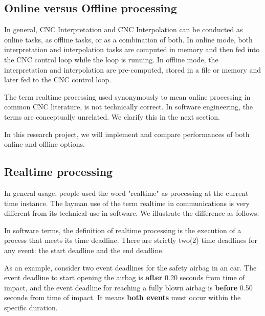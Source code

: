 \subsection{Online versus Offline processing}

In general, CNC Interpretation and CNC Interpolation can be conducted as online tasks, as offline tasks, or as a combination of both. In online mode, both interpretation and interpolation tasks are computed in memory and then fed into the CNC control loop while the loop is running. In offline mode, the interpretation and interpolation are pre-computed, stored in a file or memory and later fed to the CNC control loop. 
\vspace*{1\baselineskip}

The term realtime processing used synonymously to mean online processing in common CNC literature, is not technically correct. In software engineering, the terms are conceptually unrelated. We clarify this in the next section. 

\begin{tcolorbox}[colback=green!15!white, colframe=red!75!black, title=Research consideration no. 3]
\justifying
In this research project, we will implement and compare performances of both online and offline options. 
\end{tcolorbox}


\subsection{Realtime processing}

In general usage, people used the word "realtime" as processing at the current time instance. The layman use of the term realtime in communications is very different from its technical use in software. We illustrate the difference as follows: 
\vspace*{1\baselineskip}

In software terms, the definition of realtime processing is the execution of a process that meets its time deadline. There are strictly two(2) time deadlines for any event: the start deadline and the end deadline. 
\vspace*{1\baselineskip}

As an example, consider two event deadlines for the safety airbag in an car. The event deadline to start opening the airbag is \textbf{after} 0.20 seconds from time of impact, and the event deadline for reaching a fully blown airbag is \textbf{before} 0.50 seconds from time of impact. It means \textbf{both events} must occur within the specific duration. 
\vspace*{1\baselineskip}

